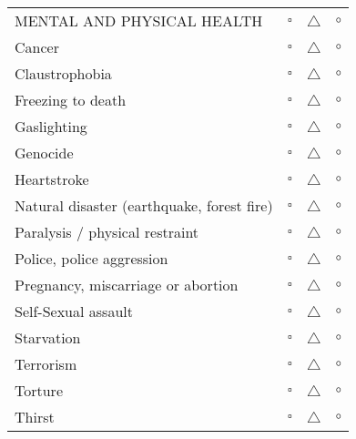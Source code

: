 \documentclass[11pt,twoside,a4paper]{article}
\begin{document}
\begin{multicols}{2}
\begin{tabular}{ p{} c c c}
		MENTAL AND PHYSICAL HEALTH \dotfill							&	{\color{green} $\square$ }	&	{\color{yellow} $\triangle$ }	&	{\color{red} $\circ$ }	\\
		Cancer \dotfill												&	{\color{green} $\square$ }	&	{\color{yellow} $\triangle$ }	&	{\color{red} $\circ$ }	\\
		Claustrophobia \dotfill										&	{\color{green} $\square$ }	&	{\color{yellow} $\triangle$ }	&	{\color{red} $\circ$ }	\\
		Freezing to death \dotfill									&	{\color{green} $\square$ }	&	{\color{yellow} $\triangle$ }	&	{\color{red} $\circ$ }	\\
		Gaslighting \dotfill										&	{\color{green} $\square$ }	&	{\color{yellow} $\triangle$ }	&	{\color{red} $\circ$ }	\\
		Genocide \dotfill											&	{\color{green} $\square$ }	&	{\color{yellow} $\triangle$ }	&	{\color{red} $\circ$ }	\\
		Heartstroke \dotfill										&	{\color{green} $\square$ }	&	{\color{yellow} $\triangle$ }	&	{\color{red} $\circ$ }	\\
		Natural disaster (earthquake, forest fire) \dotfill			&	{\color{green} $\square$ }	&	{\color{yellow} $\triangle$ }	&	{\color{red} $\circ$ }	\\
		Paralysis / physical restraint \dotfill						&	{\color{green} $\square$ }	&	{\color{yellow} $\triangle$ }	&	{\color{red} $\circ$ }	\\
		Police, police aggression \dotfill							&	{\color{green} $\square$ }	&	{\color{yellow} $\triangle$ }	&	{\color{red} $\circ$ }	\\
		Pregnancy, miscarriage or abortion \dotfill					&	{\color{green} $\square$ }	&	{\color{yellow} $\triangle$ }	&	{\color{red} $\circ$ }	\\
		Self-Sexual assault \dotfill								&	{\color{green} $\square$ }	&	{\color{yellow} $\triangle$ }	&	{\color{red} $\circ$ }	\\
		Starvation \dotfill											&	{\color{green} $\square$ }	&	{\color{yellow} $\triangle$ }	&	{\color{red} $\circ$ }	\\
		Terrorism \dotfill											&	{\color{green} $\square$ }	&	{\color{yellow} $\triangle$ }	&	{\color{red} $\circ$ }	\\
		Torture \dotfill											&	{\color{green} $\square$ }	&	{\color{yellow} $\triangle$ }	&	{\color{red} $\circ$ }	\\
		Thirst \dotfill												&	{\color{green} $\square$ }	&	{\color{yellow} $\triangle$ }	&	{\color{red} $\circ$ }	\\
		

\end{tabular}
\end{multicols}
\end{document}
